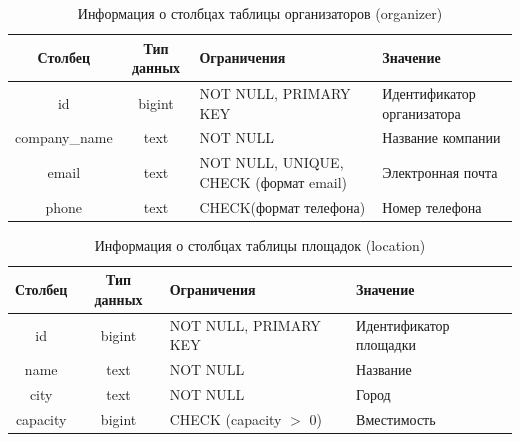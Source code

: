 \begin{table}[H]
	\begin{center}
		\caption{Информация о столбцах таблицы организаторов (organizer)}
		\begin{tabular}{|c|c|>{\centering\arraybackslash}m{5cm}|>{\centering\arraybackslash}m{3.5cm}|}
			\hline
			Столбец & Тип данных & Ограничения & Значение \\
			\hline
			id & bigint & NOT NULL, PRIMARY KEY & Идентификатор организатора \\
			\hline
			company\_name & text & NOT NULL & Название компании \\
			\hline
			email & text & NOT NULL, UNIQUE, CHECK (формат email) & Электронная почта \\
			\hline
			phone & text & CHECK(формат телефона) & Номер телефона \\
			\hline
		\end{tabular}
		\label{table:db:organizer}
	\end{center}
\end{table}

\begin{table}[H]
	\begin{center}
		\caption{Информация о столбцах таблицы площадок (location)}
		\begin{tabular}{|c|c|>{\centering\arraybackslash}m{5cm}|>{\centering\arraybackslash}m{3.5cm}|}
			\hline
			Столбец & Тип данных & Ограничения & Значение \\
			\hline
			id & bigint & NOT NULL, PRIMARY KEY & Идентификатор площадки \\
			\hline
			name & text & NOT NULL & Название \\
			\hline
			city & text & NOT NULL & Город \\
			\hline
			capacity & bigint & CHECK (capacity $>$ 0) & Вместимость \\
			\hline
		\end{tabular}
		\label{table:db:location}
	\end{center}
\end{table}

